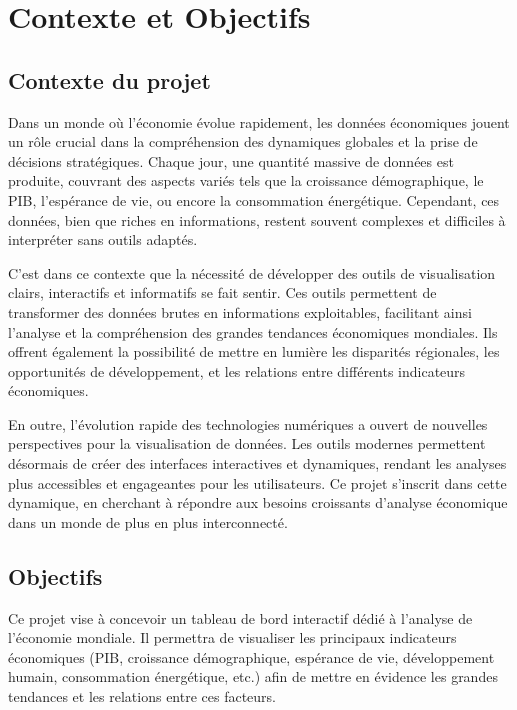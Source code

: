 \documentclass[11pt]{article}
\begin{document}
\pagebreak

\section{Contexte et Objectifs}

\subsection{Contexte du projet}

Dans un monde où l’économie évolue rapidement, les données économiques jouent un rôle crucial dans la compréhension des dynamiques globales et la prise de décisions stratégiques. Chaque jour, une quantité massive de données est produite, couvrant des aspects variés tels que la croissance démographique, le PIB, l'espérance de vie, ou encore la consommation énergétique. Cependant, ces données, bien que riches en informations, restent souvent complexes et difficiles à interpréter sans outils adaptés.

C'est dans ce contexte que la nécessité de développer des outils de visualisation clairs, interactifs et informatifs se fait sentir. Ces outils permettent de transformer des données brutes en informations exploitables, facilitant ainsi l'analyse et la compréhension des grandes tendances économiques mondiales. Ils offrent également la possibilité de mettre en lumière les disparités régionales, les opportunités de développement, et les relations entre différents indicateurs économiques.

En outre, l'évolution rapide des technologies numériques a ouvert de nouvelles perspectives pour la visualisation de données. Les outils modernes permettent désormais de créer des interfaces interactives et dynamiques, rendant les analyses plus accessibles et engageantes pour les utilisateurs. Ce projet s'inscrit dans cette dynamique, en cherchant à répondre aux besoins croissants d'analyse économique dans un monde de plus en plus interconnecté.

\subsection{Objectifs}

Ce projet vise à concevoir un tableau de bord interactif dédié à l’analyse de l’économie mondiale. Il permettra de visualiser les principaux indicateurs économiques (PIB, croissance démographique, espérance de vie, développement humain, consommation énergétique, etc.) afin de mettre en évidence les grandes tendances et les relations entre ces facteurs.
\end{document}
